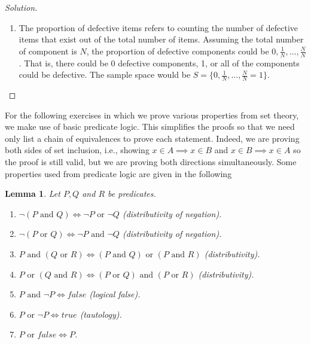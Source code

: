 \documentclass[12pt]{article}
\theoremstyle{definition}
\theoremstyle{plain}
\newtheorem*{lemma*}{Lemma}
\newenvironment{solution}
  {\begin{proof}[Solution]}
  {\end{proof}}
\newcommand{\Or}{\text{ or }}
\renewcommand{\And}{\text{ and }}
\begin{document}
\begin{enumerate}
\begin{solution}
\begin{enumerate}
	\item The proportion of defective items refers to counting the number of defective items that exist out of the total number of items. Assuming the total number of component is $ N $, the proportion of defective components could be $ 0, \frac{1}{N}, \ldots, \frac{N}{N} $. That is, there could be $ 0 $ defective components, 1, or all of the components could be defective. The sample space would be $ S = \{ 0, \frac{1}{N}, \ldots, \frac{N}{N} = 1 \} $.
\end{enumerate}
\end{solution}
	
For the following exercises in which we prove various properties from set theory, we make use of basic predicate logic. This simplifies the proofs so that we need only list a chain of equivalences to prove each statement. Indeed, we are proving both sides of set inclusion, i.e., showing $ x \in A \implies x \in B $ and $ x \in B \implies x \in A $ so the proof is still valid, but we are proving both directions simultaneously. Some properties used from predicate logic are given in the following

\begin{lemma*}
Let $ P, Q$ and $ R $ be predicates.
\begin{enumerate}
\item $ \neg (P \And Q) \iff \neg P \Or \neg Q $ (distributivity of negation).
\item $ \neg (P \Or Q) \iff \neg P \And \neg Q $ (distributivity of negation).
\item $ P \And (Q \Or R) \iff (P \And Q) \Or (P \And R) $ (distributivity).
\item $ P \Or (Q \And R) \iff (P \Or Q) \And (P \Or R) $ (distributivity).
\item $ P \And \neg P \iff false$ (logical false).
\item $ P \Or \neg P \iff true $ (tautology).
\item $ P \Or false \iff P $.
\end{enumerate}
\end{lemma*}
	

\end{enumerate}
\end{document}
